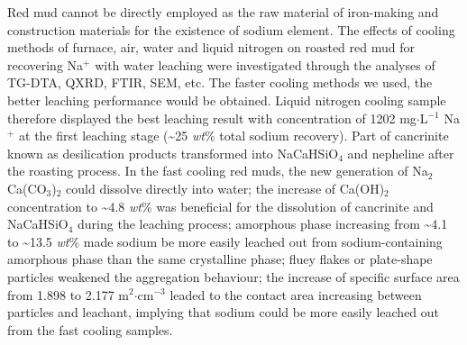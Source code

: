 \begin{eabstract}
Red mud cannot be directly employed as the raw material of iron-making and construction materials for the existence of sodium element. The effects of cooling methods of furnace, air, water and liquid nitrogen on roasted red mud for recovering Na$ ^{\mathrm{+}} $ with water leaching were investigated through the analyses of TG-DTA, QXRD, FTIR, SEM, etc. The faster cooling methods we used, the better leaching performance would be obtained. Liquid nitrogen cooling sample therefore displayed the best leaching result with concentration of 1202 mg$\cdot$L$ ^{\mathrm{-1}} $ Na$ ^{\mathrm{+}} $ at the first leaching stage (\textasciitilde 25 \textit{wt}\% total sodium recovery). Part of cancrinite known as desilication products transformed into NaCaHSiO$ _{\mathrm{4}} $ and nepheline after the roasting process. In the fast cooling red muds, the new generation of Na$ _{\mathrm{2}} $Ca(CO$ _{\mathrm{3}} $)$ _{\mathrm{2}} $ could dissolve directly into water; the increase of Ca(OH)$ _{\mathrm{2}} $ concentration to \textasciitilde 4.8 \textit{wt}\% was beneficial for the dissolution of cancrinite and NaCaHSiO$ _{\mathrm{4}} $ during the leaching process; amorphous phase increasing from \textasciitilde 4.1 to \textasciitilde 13.5 \textit{wt}\% made sodium be more easily leached out from sodium-containing amorphous phase than the same crystalline phase; fluey flakes or plate-shape particles weakened the aggregation behaviour; the increase of specific surface area from 1.898 to 2.177 m$ ^{\mathrm{2}} $$ \cdot $cm$ ^{\mathrm{-3}} $ leaded to the contact area increasing between particles and leachant, implying that sodium could be more easily leached out from the fast cooling samples. 


\end{eabstract}
